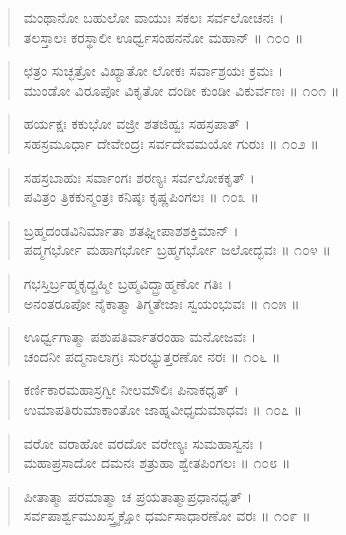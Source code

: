 \begin{verse}
ಮಂಥಾನೋ ಬಹುಲೋ ವಾಯುಃ ಸಕಲಃ ಸರ್ವಲೋಚನಃ ।\\ತಲಸ್ತಾಲಃ ಕರಸ್ಥಾಲೀ ಊರ್ಧ್ವಸಂಹನನೋ ಮಹಾನ್ \num{॥ ೧೦೦ ॥}
\end{verse}

\begin{verse}
ಛತ್ರಂ ಸುಚ್ಛತ್ರೋ ವಿಖ್ಯಾತೋ ಲೋಕಃ ಸರ್ವಾಶ್ರಯಃ ಕ್ರಮಃ ।\\ಮುಂಡೋ ವಿರೂಪೋ ವಿಕೃತೋ ದಂಡೀ ಕುಂಡೀ ವಿಕುರ್ವಣಃ \num{॥ ೧೦೧ ॥}
\end{verse}

\begin{verse}
ಹರ್ಯಕ್ಷಃ ಕಕುಭೋ ವಜ್ರೀ ಶತಜಿಹ್ವಃ ಸಹಸ್ರಪಾತ್ ।\\ಸಹಸ್ರಮೂರ್ಧಾ ದೇವೇಂದ್ರಃ ಸರ್ವದೇವಮಯೋ ಗುರುಃ \num{॥ ೧೦೨ ॥}
\end{verse}

\begin{verse}
ಸಹಸ್ರಬಾಹುಃ ಸರ್ವಾಂಗಃ ಶರಣ್ಯಃ ಸರ್ವಲೋಕಕೃತ್ ।\\ಪವಿತ್ರಂ ತ್ರಿಕಕುನ್ಮಂತ್ರಃ ಕನಿಷ್ಠಃ ಕೃಷ್ಣಪಿಂಗಲಃ \num{॥ ೧೦೩ ॥}
\end{verse}

\begin{verse}
ಬ್ರಹ್ಮದಂಡವಿನಿರ್ಮಾತಾ ಶತಘ್ನೀಪಾಶಶಕ್ತಿಮಾನ್ ।\\ಪದ್ಮಗರ್ಭೋ ಮಹಾಗರ್ಭೋ ಬ್ರಹ್ಮಗರ್ಭೋ ಜಲೋದ್ಭವಃ \num{॥ ೧೦೪ ॥}
\end{verse}

\begin{verse}
ಗಭಸ್ತಿರ್ಬ್ರಹ್ಮಕೃದ್ಬ್ರಹ್ಮೀ ಬ್ರಹ್ಮವಿದ್ಬ್ರಾಹ್ಮಣೋ ಗತಿಃ ।\\ಅನಂತರೂಪೋ ನೈಕಾತ್ಮಾ ತಿಗ್ಮತೇಜಾಃ ಸ್ವಯಂಭುವಃ \num{॥ ೧೦೫ ॥}
\end{verse}

\begin{verse}
ಊರ್ಧ್ವಗಾತ್ಮಾ ಪಶುಪತಿರ್ವಾತರಂಹಾ ಮನೋಜವಃ ।\\ಚಂದನೀ ಪದ್ಮನಾಲಾಗ್ರಃ ಸುರಭ್ಯುತ್ತರಣೋ ನರಃ \num{॥ ೧೦೬ ॥}
\end{verse}

\begin{verse}
ಕರ್ಣಿಕಾರಮಹಾಸ್ರಗ್ವೀ ನೀಲಮೌಲಿಃ ಪಿನಾಕಧೃತ್ ।\\ಉಮಾಪತಿರುಮಾಕಾಂತೋ ಜಾಹ್ನವೀಧೃದುಮಾಧವಃ \num{॥ ೧೦೭ ॥}
\end{verse}

\begin{verse}
ವರೋ ವರಾಹೋ ವರದೋ ವರೇಣ್ಯಃ ಸುಮಹಾಸ್ವನಃ ।\\ಮಹಾಪ್ರಸಾದೋ ದಮನಃ ಶತ್ರುಹಾ ಶ್ವೇತಪಿಂಗಲಃ \num{॥ ೧೦೮ ॥}
\end{verse}

\begin{verse}
ಪೀತಾತ್ಮಾ ಪರಮಾತ್ಮಾ ಚ ಪ್ರಯತಾತ್ಮಾಪ್ರಧಾನಧೃತ್ ।\\ಸರ್ವಪಾರ್ಶ್ವಮುಖಸ್ತ್ರ್ಯಕ್ಷೋ ಧರ್ಮಸಾಧಾರಣೋ ವರಃ \num{॥ ೧೦೯ ॥}
\end{verse}

